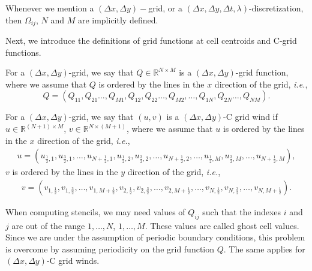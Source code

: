 \begin{remark}
	Whenever we mention a $(\Delta x,\Delta y)-$grid, or a $(\Delta x,\Delta y,\Delta t, \lambda)$-discretization,
	then $\Omega_{ij}$, $N$ and $M$ are implicitly defined.
\end{remark}
Next, we introduce the definitions of grid functions at cell centroids and C-grid functions. 
\begin{definition}
	\label{chp2-rmk-2d-gridfunction1}
	For a $(\Delta x,\Delta y)$-grid, we say that $Q \in \mathbb{R}^{N\times M}$ is a 
	$(\Delta x,\Delta y)$-grid function, where we assume that $Q$ is ordered by
	the lines in the $x$ direction of the grid, \textit{i.e.},
	\begin{equation*}
		Q = (Q_{11}, Q_{21} \ldots, Q_{M1}, Q_{12}, Q_{22} \ldots, Q_{M2}, \ldots,  Q_{1N}, Q_{2N} \ldots, Q_{NM}).
	\end{equation*}
\end{definition}
\begin{definition}
	\label{chp2-rmk-2d-gridfunction2}
	For a $(\Delta x,\Delta y)$-grid, we say that $(u,v)$ is a $(\Delta x,\Delta y)$-C grid wind if 
	$u \in \mathbb{R}^{(N+1) \times M}$, $v \in \mathbb{R}^{N \times (M+1)}$, where we assume that $u$ is ordered by
	the lines in the $x$ direction of the grid, \textit{i.e.},
	\begin{align*}
	u = (u_{\frac{1}{2},1}, u_{\frac{3}{2},1}, \ldots, u_{N+\frac{1}{2},1}, u_{\frac{1}{2},2}, u_{\frac{3}{2},2}, \ldots, u_{N+\frac{1}{2},2}, \ldots ,
	u_{\frac{1}{2},M}, u_{\frac{3}{2},M}, \ldots, u_{N+\frac{1}{2},M}),
	\end{align*}
	$v$ is ordered by the lines in the $y$ direction of the grid, \textit{i.e.},
	\begin{align*}
	v = (v_{1,\frac{1}{2}}, v_{1,\frac{3}{2}}, \ldots, v_{1,M+\frac{1}{2}}, v_{2,\frac{1}{2}}, v_{2,\frac{3}{2}}, \ldots, v_{2,M+\frac{1}{2}}, \ldots ,
	v_{N,\frac{1}{2}}, v_{N,\frac{3}{2}}, \ldots, v_{N,M+\frac{1}{2}}).
\end{align*}
\end{definition}
\begin{remark}
	When computing stencils, we may need values of $Q_{ij}$ such that the
	indexes $i$ and $j$ are out of the range $1,\ldots, N$, $1,\ldots, M$.
	These values are called ghost cell values.
	Since we are under the assumption of periodic boundary conditions, this problem
	is overcome by assuming periodicity on the grid function $Q$. 
	The same applies for $(\Delta x,\Delta y)$-C grid winds.
\end{remark}
